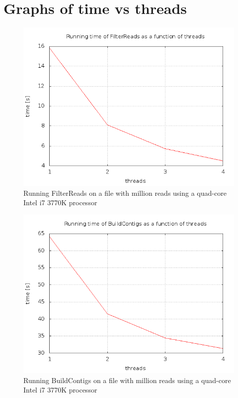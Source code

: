 \documentclass[a4paper]{report}
\begin{document}
\newpage
\section{Graphs of time vs threads}

\begin{figure}[h!]
\centering\includegraphics[scale=0.6]{graphs/threadtime_filter1.png}
\caption{Running FilterReads on a file with million reads using a quad-core Intel i7 3770K processor}
\label{filtertime1}
\end{figure}

\begin{figure}[h!]
\centering\includegraphics[scale=0.6]{graphs/threadtime_contigs1.png}
\caption{Running BuildContigs on a file with million reads using a quad-core Intel i7 3770K processor}
\label{contigtime1}
\end{figure}
\end{document}
